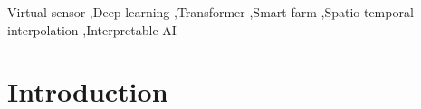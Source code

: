 \documentclass[final,5p,times,twocolumn,authoryear]{elsarticle}
\begin{document}
\begin{frontmatter}
\begin{abstract}
abstract 
for real 







\end{abstract}



\begin{keyword}

Virtual sensor \sep Deep learning \sep Transformer \sep Smart farm \sep  Spatio-temporal interpolation \sep Interpretable AI 




\end{keyword}

\end{frontmatter}







\renewcommand{\figurename}{Fig.} %


\section{Introduction}
\label{sec:intro}
\end{document}
